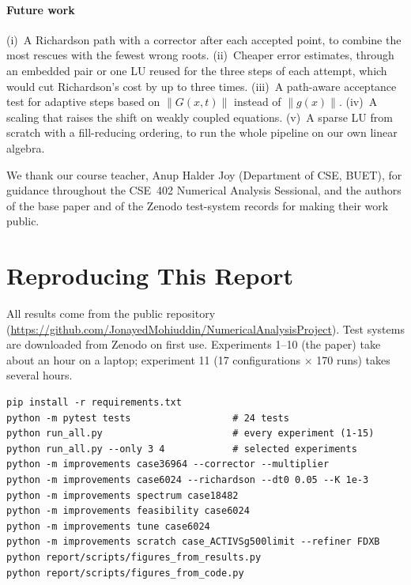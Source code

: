 \documentclass[sigconf,nonacm]{acmart}
\newcommand{\norm}[1]{\lVert #1\rVert}
\newcommand{\repo}{\url{https://github.com/JonayedMohiuddin/NumericalAnalysisProject}}
\begin{document}
\paragraph{Future work} (i)~A Richardson path with a corrector after each accepted point, to combine the
most rescues with the fewest wrong roots. (ii)~Cheaper error estimates, through an embedded pair or one LU
reused for the three steps of each attempt, which would cut Richardson's cost by up to three times. (iii)~A
path-aware acceptance test for adaptive steps based on $\norm{G(x,t)}$ instead of $\norm{g(x)}$. (iv)~A scaling
that raises the shift on weakly coupled equations. (v)~A sparse LU from scratch with a fill-reducing ordering,
to run the whole pipeline on our own linear algebra.

\begin{acks}
We thank our course teacher, Anup Halder Joy (Department of CSE, BUET), for guidance throughout the CSE~402
Numerical Analysis Sessional, and the authors of the base paper and of the Zenodo test-system records for
making their work public.
\end{acks}




\clearpage
\onecolumn
\appendix
\section{Reproducing This Report}\label{app:repro}
All results come from the public repository~\cite{ourrepo} (\repo). Test systems are downloaded from Zenodo
on first use. Experiments 1--10 (the paper) take about an hour on a laptop; experiment 11 (17 configurations
$\times$ 170 runs) takes several hours.
\begin{lstlisting}[style=sh]
pip install -r requirements.txt
python -m pytest tests                  # 24 tests
python run_all.py                       # every experiment (1-15)
python run_all.py --only 3 4            # selected experiments
python -m improvements case36964 --corrector --multiplier
python -m improvements case6024 --richardson --dt0 0.05 --K 1e-3
python -m improvements spectrum case18482
python -m improvements feasibility case6024
python -m improvements tune case6024
python -m improvements scratch case_ACTIVSg500limit --refiner FDXB
python report/scripts/figures_from_results.py
python report/scripts/figures_from_code.py
\end{lstlisting}
\end{document}
